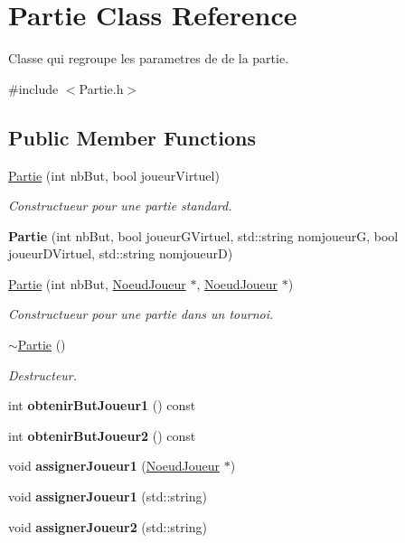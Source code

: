 \hypertarget{class_partie}{}\section{Partie Class Reference}
\label{class_partie}


Classe qui regroupe les parametres de de la partie.  




{\ttfamily \#include $<$Partie.\+h$>$}

\subsection*{Public Member Functions}
\begin{DoxyCompactItemize}
\item 
\hyperlink{group__inf2990_gae0fd466396b1f1da7f24106ea1336b7c}{Partie} (int nb\+But, bool joueur\+Virtuel)
\begin{DoxyCompactList}\small\item\em Constructueur pour une partie standard. \end{DoxyCompactList}\item 
{\bfseries Partie} (int nb\+But, bool joueur\+G\+Virtuel, std\+::string nomjoueurG, bool joueur\+D\+Virtuel, std\+::string nomjoueurD)
\item 
\hyperlink{group__inf2990_ga60f6de457bc2b70555f26964174303a7}{Partie} (int nb\+But, \hyperlink{class_noeud_joueur}{Noeud\+Joueur} $\ast$, \hyperlink{class_noeud_joueur}{Noeud\+Joueur} $\ast$)
\begin{DoxyCompactList}\small\item\em Constructueur pour une partie dans un tournoi. \end{DoxyCompactList}\item 
\hyperlink{group__inf2990_gae4afeb7336bb84427272cfb7018b5e3d}{$\sim$\+Partie} ()
\begin{DoxyCompactList}\small\item\em Destructeur. \end{DoxyCompactList}\item 
int {\bfseries obtenir\+But\+Joueur1} () const
\item 
int {\bfseries obtenir\+But\+Joueur2} () const
\item 
void {\bfseries assigner\+Joueur1} (\hyperlink{class_noeud_joueur}{Noeud\+Joueur} $\ast$)
\item 
void {\bfseries assigner\+Joueur1} (std\+::string)
\item 
void {\bfseries assigner\+Joueur2} (std\+::string)

\end{DoxyCompactItemize}
